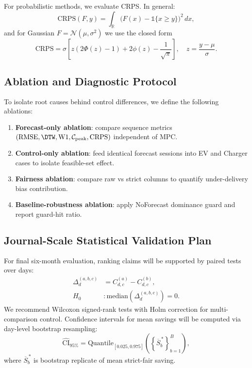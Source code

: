 \documentclass[journal]{IEEEtran}
\newcommand{\Wone}{\mathrm{W1}}
\newcommand{\RMSE}{\mathrm{RMSE}}
\begin{document}
For probabilistic methods, we evaluate CRPS. In general:
\begin{equation}
\mathrm{CRPS}(F,y)=\int_{\mathbb{R}}\big(F(x)-\mathbb{1}\{x\ge y\}\big)^2\,dx,
\end{equation}
and for Gaussian $F=\mathcal{N}(\mu,\sigma^2)$ we use the closed form
\begin{equation}
\mathrm{CRPS}=\sigma\left[z\left(2\Phi(z)-1\right)+2\phi(z)-\frac{1}{\sqrt{\pi}}\right],\quad z=\frac{y-\mu}{\sigma}.
\end{equation}

\subsection{Ablation and Diagnostic Protocol}
To isolate root causes behind control differences, we define the following ablations:
\begin{enumerate}
    \item \textbf{Forecast-only ablation}: compare sequence metrics $(\RMSE,\DTW,\Wone,\mathcal{C}_{\mathrm{peak}},\mathrm{CRPS})$ independent of MPC.
    \item \textbf{Control-only ablation}: feed identical forecast sessions into EV and Charger cases to isolate feasible-set effect.
    \item \textbf{Fairness ablation}: compare raw vs strict columns to quantify under-delivery bias contribution.
    \item \textbf{Baseline-robustness ablation}: apply NoForecast dominance guard and report guard-hit ratio.
\end{enumerate}

\subsection{Journal-Scale Statistical Validation Plan}
For final six-month evaluation, ranking claims will be supported by paired tests over days:
\begin{align}
\Delta_d^{(a,b,c)} &= C_{d,c}^{(a)}-C_{d,c}^{(b)},\\
H_0 &: \mathrm{median}(\Delta_d^{(a,b,c)})=0.
\end{align}
We recommend Wilcoxon signed-rank tests with Holm correction for multi-comparison control. Confidence intervals for mean savings will be computed via day-level bootstrap resampling:
\begin{equation}
\widehat{\mathrm{CI}}_{95\%} = \mathrm{Quantile}_{[0.025,0.975]}\left(\left\{\overline{S}^{\,*}_b\right\}_{b=1}^{B}\right),
\end{equation}
where $\overline{S}^{\,*}_b$ is bootstrap replicate of mean strict-fair saving.
\end{document}

